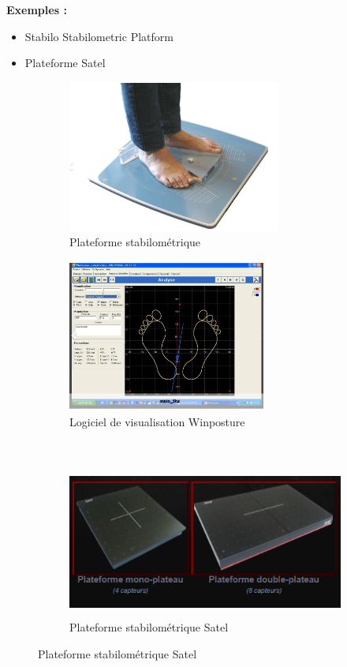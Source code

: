 \textbf{Exemples :}
\begin{itemize}
  \item Stabilo Stabilometric Platform
  \item Plateforme Satel
\end{itemize}

\begin{figure}[H]
 \centering
  \begin{subfigure}[b]{0.45\textwidth}
    \centering
    \includegraphics[height=5cm]{images/pression_plantaire/plateforme-stabilometrique.png}
    \caption{Plateforme stabilométrique}\label{fig:plateforme_stabilometrique}
  \end{subfigure}
  \begin{subfigure}[b]{0.45\textwidth}
   \centering
    \includegraphics[height=5cm]{images/pression_plantaire/winposture.png}
    \caption{Logiciel de visualisation Winposture}\label{fig:winposture}
  \end{subfigure} \\
  \begin{subfigure}[b]{0.45\textwidth}
    \hspace{-1.5cm}
    \includegraphics[height=5cm]{images/pression_plantaire/satel.png}
    \caption{Plateforme stabilométrique Satel}\label{fig:satel}
  \end{subfigure}
\end{figure}

